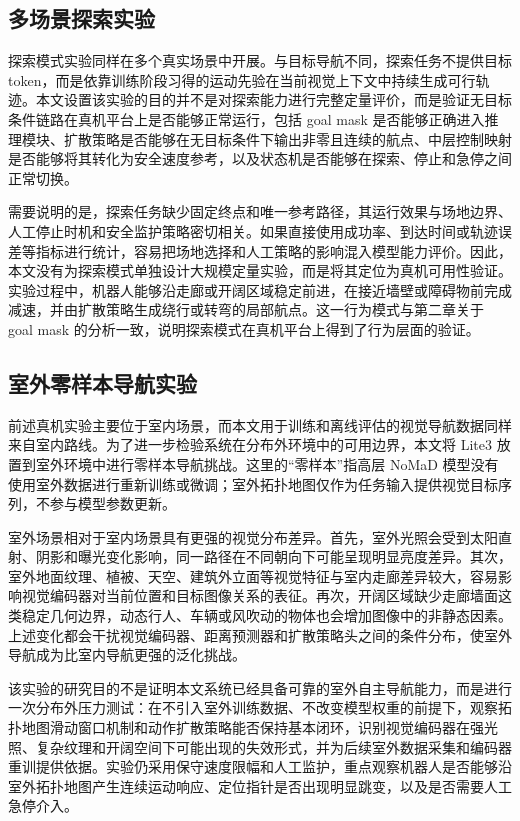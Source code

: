 \subsection{多场景探索实验}

探索模式实验同样在多个真实场景中开展。与目标导航不同，探索任务不提供目标 token，而是依靠训练阶段习得的运动先验在当前视觉上下文中持续生成可行轨迹。本文设置该实验的目的并不是对探索能力进行完整定量评价，而是验证无目标条件链路在真机平台上是否能够正常运行，包括 goal mask 是否能够正确进入推理模块、扩散策略是否能够在无目标条件下输出非零且连续的航点、中层控制映射是否能够将其转化为安全速度参考，以及状态机是否能够在探索、停止和急停之间正常切换。

需要说明的是，探索任务缺少固定终点和唯一参考路径，其运行效果与场地边界、人工停止时机和安全监护策略密切相关。如果直接使用成功率、到达时间或轨迹误差等指标进行统计，容易把场地选择和人工策略的影响混入模型能力评价。因此，本文没有为探索模式单独设计大规模定量实验，而是将其定位为真机可用性验证。实验过程中，机器人能够沿走廊或开阔区域稳定前进，在接近墙壁或障碍物前完成减速，并由扩散策略生成绕行或转弯的局部航点。这一行为模式与第二章关于 goal mask 的分析一致，说明探索模式在真机平台上得到了行为层面的验证。

\subsection{室外零样本导航实验}

前述真机实验主要位于室内场景，而本文用于训练和离线评估的视觉导航数据同样来自室内路线。为了进一步检验系统在分布外环境中的可用边界，本文将 Lite3 放置到室外环境中进行零样本导航挑战。这里的``零样本''指高层 NoMaD 模型没有使用室外数据进行重新训练或微调；室外拓扑地图仅作为任务输入提供视觉目标序列，不参与模型参数更新。

室外场景相对于室内场景具有更强的视觉分布差异。首先，室外光照会受到太阳直射、阴影和曝光变化影响，同一路径在不同朝向下可能呈现明显亮度差异。其次，室外地面纹理、植被、天空、建筑外立面等视觉特征与室内走廊差异较大，容易影响视觉编码器对当前位置和目标图像关系的表征。再次，开阔区域缺少走廊墙面这类稳定几何边界，动态行人、车辆或风吹动的物体也会增加图像中的非静态因素。上述变化都会干扰视觉编码器、距离预测器和扩散策略头之间的条件分布，使室外导航成为比室内导航更强的泛化挑战。

该实验的研究目的不是证明本文系统已经具备可靠的室外自主导航能力，而是进行一次分布外压力测试：在不引入室外训练数据、不改变模型权重的前提下，观察拓扑地图滑动窗口机制和动作扩散策略能否保持基本闭环，识别视觉编码器在强光照、复杂纹理和开阔空间下可能出现的失效形式，并为后续室外数据采集和编码器重训提供依据。实验仍采用保守速度限幅和人工监护，重点观察机器人是否能够沿室外拓扑地图产生连续运动响应、定位指针是否出现明显跳变，以及是否需要人工急停介入。

